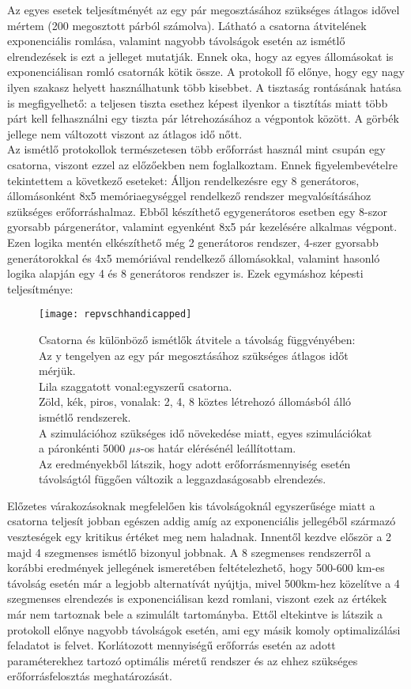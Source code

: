 Az egyes esetek teljesítményét az egy pár megosztásához szükséges átlagos idővel mértem (200 megosztott párból számolva).
Látható a csatorna átvitelének exponenciális romlása, valamint nagyobb távolságok esetén az ismétlő elrendezések is ezt a jelleget mutatják. Ennek oka, hogy az egyes állomásokat is exponenciálisan romló csatornák kötik össze. A protokoll fő előnye, hogy egy nagy ilyen szakasz helyett használhatunk több kisebbet. A tisztaság rontásának hatása is megfigyelhető: a teljesen tiszta esethez képest ilyenkor a tisztítás miatt több párt kell felhasználni egy tiszta pár létrehozásához a végpontok között. A görbék jellege nem változott viszont az átlagos idő nőtt.\\
Az ismétlő protokollok természetesen több erőforrást használ mint csupán egy csatorna, viszont ezzel az előzőekben nem foglalkoztam. Ennek figyelembevételre tekintettem a következő eseteket: Álljon rendelkezésre egy 8 generátoros, állomásonként 8x5 memóriaegységgel rendelkező rendszer megvalósításához szükséges erőforráshalmaz. Ebből készíthető egygenerátoros esetben egy 8-szor gyorsabb párgenerátor, valamint egyenként 8x5 pár kezelésére alkalmas végpont. Ezen logika mentén elkészíthető még 2 generátoros rendszer, 4-szer gyorsabb generátorokkal és 4x5 memóriával rendelkező állomásokkal, valamint hasonló logika alapján egy 4 és 8 generátoros rendszer is. Ezek egymáshoz képesti teljesítménye:
\begin{figure}[H]
\centering
\texttt{[image: repvschhandicapped]}
\caption[Csatorna és ismétlők karakterisztikája 2]
{Csatorna és különböző ismétlők átvitele a távolság függvényében:\\
Az y tengelyen az egy pár megosztásához szükséges átlagos időt mérjük.\\
Lila szaggatott vonal:egyszerű csatorna.\\
Zöld, kék, piros, vonalak: 2, 4, 8 köztes létrehozó állomásból álló ismétlő rendszerek.\\
A szimulációhoz szükséges idő növekedése miatt, egyes szimulációkat a páronkénti 5000 $\mu s$-os határ elérésénél leállítottam.\\
Az eredményekből látszik, hogy adott erőforrásmennyiség esetén távolságtól függően változik a leggazdaságosabb elrendezés.
}
\end{figure}
Előzetes várakozásoknak megfelelően kis távolságoknál egyszerűsége miatt a csatorna teljesít jobban egészen addig amíg az exponenciális jellegéből származó  veszteségek egy kritikus értéket meg nem haladnak. Innentől kezdve először a 2 majd 4 szegmenses ismétlő bizonyul jobbnak. A 8 szegmenses rendszerről a korábbi eredmények jellegének ismeretében feltételezhető, hogy 500-600 km-es távolság esetén már a legjobb alternatívát nyújtja, mivel 500km-hez közelítve a 4 szegmenses elrendezés is exponenciálisan kezd romlani, viszont ezek az értékek már nem tartoznak bele a szimulált tartományba. Ettől eltekintve is látszik a protokoll előnye nagyobb távolságok esetén, ami egy másik komoly optimalizálási feladatot is felvet. Korlátozott mennyiségű erőforrás esetén az adott paraméterekhez tartozó optimális méretű rendszer és az ehhez szükséges erőforrásfelosztás meghatározását.

